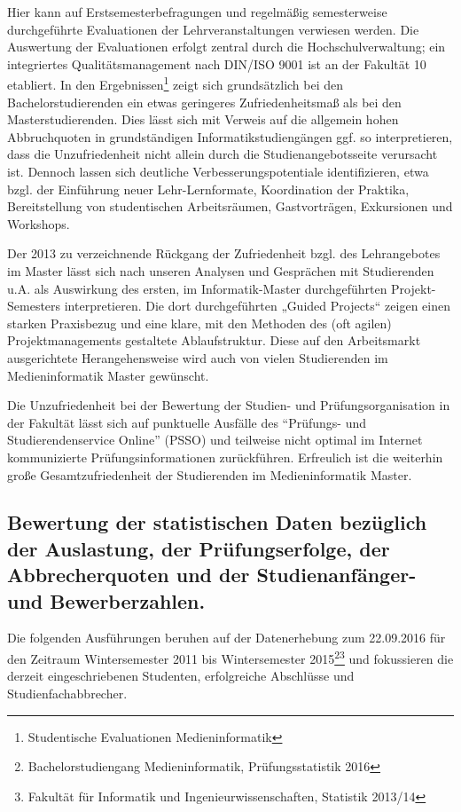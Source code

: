 Hier kann auf Erstsemesterbefragungen und regelmäßig semesterweise
durchgeführte Evaluationen der Lehrveranstaltungen verwiesen werden. Die
Auswertung der Evaluationen erfolgt zentral durch die
Hochschulverwaltung; ein integriertes Qualitätsmanagement nach DIN/ISO
9001 ist an der Fakultät 10 etabliert. In den Ergebnissen\footnote{Studentische
  Evaluationen Medieninformatik} zeigt sich grundsätzlich bei den
Bachelorstudierenden ein etwas geringeres Zufriedenheitsmaß als bei den
Masterstudierenden. Dies lässt sich mit Verweis auf die allgemein hohen
Abbruchquoten in grundständigen Informatikstudiengängen ggf. so
interpretieren, dass die Unzufriedenheit nicht allein durch die
Studienangebotsseite verursacht ist. Dennoch lassen sich deutliche
Verbesserungspotentiale identifizieren, etwa bzgl. der Einführung neuer
Lehr-Lernformate, Koordination der Praktika, Bereitstellung von
studentischen Arbeitsräumen, Gastvorträgen, Exkursionen und Workshops.

Der 2013 zu verzeichnende Rückgang der Zufriedenheit bzgl. des
Lehrangebotes im Master lässt sich nach unseren Analysen und Gesprächen
mit Studierenden u.A. als Auswirkung des ersten, im Informatik-Master
durchgeführten Projekt-Semesters interpretieren. Die dort durchgeführten
„Guided Projects`` zeigen einen starken Praxisbezug und eine klare, mit
den Methoden des (oft agilen) Projektmanagements gestaltete
Ablaufstruktur. Diese auf den Arbeitsmarkt ausgerichtete
Herangehensweise wird auch von vielen Studierenden im Medieninformatik
Master gewünscht.

Die Unzufriedenheit bei der Bewertung der Studien- und
Prüfungsorganisation in der Fakultät lässt sich auf punktuelle Ausfälle
des ``Prüfungs- und Studierendenservice Online'' (PSSO) und teilweise
nicht optimal im Internet kommunizierte Prüfungsinformationen
zurückführen. Erfreulich ist die weiterhin große Gesamtzufriedenheit der
Studierenden im Medieninformatik Master.

\subsection{Bewertung der statistischen Daten bezüglich der
Auslastung, der Prüfungserfolge, der Abbrecherquoten und der
Studienanfänger- und
Bewerberzahlen.}\label{bewertung-der-statistischen-daten-bezuxfcglich-der-auslastung-der-pruxfcfungserfolge-der-abbrecherquoten-und-der-studienanfuxe4nger--und-bewerberzahlen.}

Die folgenden Ausführungen beruhen auf der Datenerhebung zum 22.09.2016
für den Zeitraum Wintersemester 2011 bis Wintersemester 2015\footnote{Bachelorstudiengang
  Medieninformatik, Prüfungsstatistik 2016}\footnote{Fakultät für
  Informatik und Ingenieurwissenschaften, Statistik 2013/14} und
fokussieren die derzeit eingeschriebenen Studenten, erfolgreiche
Abschlüsse und Studienfachabbrecher.

